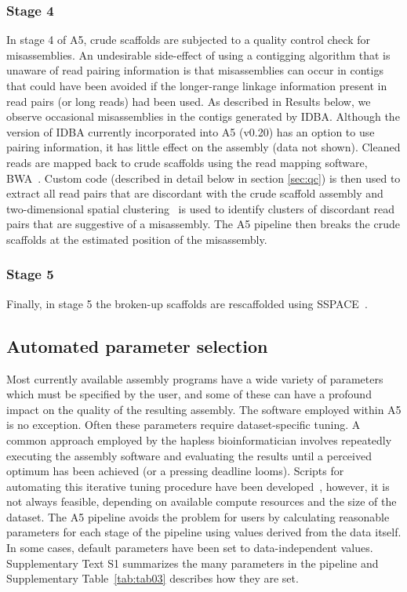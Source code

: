 \documentclass[10pt]{article}
\begin{document}
\subsubsection*{Stage 4}
In stage 4 of A5, crude 
scaffolds are subjected to a quality control check for misassemblies. 
An undesirable side-effect of using a contigging algorithm that is unaware of read pairing information is that misassemblies can occur in contigs 
that could have been avoided if the longer-range linkage information present in read pairs (or long reads) had been used.  As described in Results 
below, we observe occasional misassemblies in the contigs generated by IDBA. Although the version of IDBA currently incorporated into A5 (v0.20) has
an option to use pairing information, it has little effect on the assembly (data not shown). 
Cleaned reads are mapped back to crude scaffolds using the read mapping software,
BWA~\cite{bwa}. Custom code (described in detail below in section \ref{sec:qc}) is then used to extract all read pairs that are discordant with the 
crude scaffold assembly and two-dimensional spatial clustering~\cite{DBSCAN} is used to identify clusters of discordant read pairs that are 
suggestive of a misassembly. The A5 pipeline then breaks the crude scaffolds at the estimated position of the misassembly.

\subsubsection*{Stage 5}
Finally, in stage 5 the broken-up scaffolds are rescaffolded using SSPACE~\cite{Boetzer2011}.

\subsection*{Automated parameter selection}

Most currently available assembly programs have a wide variety of parameters which must
be specified by the user, and some of these can have a profound impact on the quality of the 
resulting assembly. The software employed within A5 is no exception. 
Often these parameters require dataset-specific tuning.  A common approach
employed by the hapless bioinformatician involves repeatedly
executing the assembly software and evaluating the results until a perceived 
optimum has been achieved (or a pressing deadline looms). Scripts for automating this iterative tuning procedure have 
been developed~\cite{VelvetOpt}, however, it is not always feasible, depending on available compute resources and the size 
of the dataset. The A5 pipeline avoids the problem for users by calculating reasonable
parameters for each stage of the pipeline using values derived from the data itself. In some
cases, default parameters have been set to data-independent values. Supplementary Text S1 
summarizes the many parameters in the pipeline and Supplementary Table~\ref{tab:tab03} describes how they are set.
\end{document}
